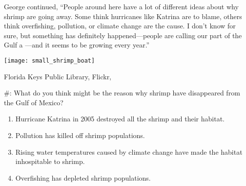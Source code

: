 \documentclass[t]{beamer}
\newcommand*{\cq}[1]{%
	\#{\lining#1}:%
}
\begin{document}
\begin{frame}

	\begin{multicols}{2}
	
	George continued, “People around here have a lot of different 
	ideas about why shrimp are going away. Some think hurricanes 
	like Katrina are to blame, others think overfishing, pollution, or 
	climate change are the cause.  I don’t know for sure, but something 
	has definitely happened—people are calling our part of the Gulf a 
	—and it seems to be growing every year.”
	\columnbreak
	
		{\centering\texttt{[image: small\_shrimp\_boat]}\par
		}
	\end{multicols}
	
	\vfilll
	
	\hfill \tiny Florida Keys Public Library, Flickr, 
\end{frame}
%
\begin{frame}[t]{\cq{1} What do you think might be the reason why shrimp have disappeared from the Gulf of Mexico?}

	\begin{enumerate}
		\item Hurricane Katrina in 2005 destroyed all the shrimp and their habitat.
		
		\item Pollution has killed off shrimp populations.
		
		\item Rising water temperatures caused by climate change have made the habitat inhospitable to shrimp.
		
		\item Overfishing has depleted shrimp populations. 
	\end{enumerate}
\end{frame}
%
%
%		
%		
%		
%		
%
%
\end{document}
